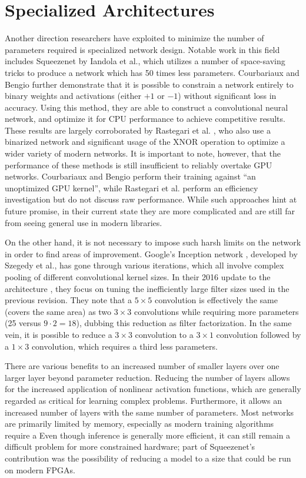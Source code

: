 \section{Specialized Architectures}
Another direction researchers have exploited to minimize the number of parameters required is specialized network design.
Notable work in this field includes Squeezenet \cite{iandola2016squeezenet} by Iandola et al., which utilizes a number of space-saving tricks to produce a network which has 50 times less parameters.
Courbariaux and Bengio further demonstrate that it is possible to constrain a network entirely to binary weights and activations (either $+1$ or $-1$) without significant loss in accuracy.
Using this method, they are able to construct a convolutional neural network, and optimize it for CPU performance to achieve competitive results.
These results are largely corroborated by Rastegari et al. \cite{rastegari2016xnor}, who also use a binarized network and significant usage of the XNOR operation to optimize a wider variety of modern networks.
It is important to note, however, that the performance of these methods is still insufficient to reliably overtake GPU networks.
Courbariaux and Bengio perform their training against ``an unoptimized GPU kernel'', while Rastegari et al. perform an efficiency investigation but do not discuss raw performance.
While such approaches hint at future promise, in their current state they are more complicated and are still far from seeing general use in modern libraries.

On the other hand, it is not necessary to impose such harsh limits on the network in order to find areas of improvement.
Google's Inception network \cite{szegedy2015going}, developed by Szegedy et al., has gone through various iterations, which all involve complex pooling of different convolutional kernel sizes.
In their 2016 update to the architecture \cite{szegedy2016rethinking}, they focus on tuning the inefficiently large filter sizes used in the previous revision.
They note that a $5\times 5$ convolution is effectively the same (covers the same area) as two $3\times 3$ convolutions while requiring more parameters (25 versus $9 \cdot 2 = 18$), dubbing this reduction as filter factorization.
In the same vein, it is possible to reduce a $3\times 3$ convolution to a $3\times 1$ convolution followed by a $1\times 3$ convolution, which requires a third less parameters.

There are various benefits to an increased number of smaller layers over one larger layer beyond parameter reduction.
Reducing the number of layers allows for the increased application of nonlinear activation functions, which are generally regarded as critical for learning complex problems.
Furthermore, it allows an increased number of layers with the same number of parameters.
Most networks are primarily limited by memory, especially as modern training algorithms require a 
Even though inference is generally more efficient, it can still remain a difficult problem for more constrained hardware; part of Squeezenet's contribution was the possibility of reducing a model to a size that could be run on modern FPGAs.

